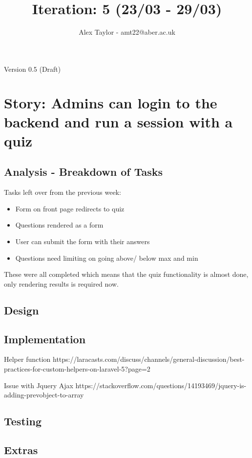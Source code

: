 \documentclass{article}
\title{Iteration: 5 (23/03 - 29/03)}
\author{Alex Taylor - amt22@aber.ac.uk}
\begin{document}
\maketitle
\begin{center}
	Version 0.5 (Draft)
\end{center}
\tableofcontents
\thispagestyle{empty}
\newpage

\section{Story: Admins can login to the backend and run a session with a quiz}
\subsection{Analysis - Breakdown of Tasks}
Tasks left over from the previous week:
\begin{itemize}
	\item Form on front page redirects to quiz
	\item Questions rendered as a form
	\item User can submit the form with their answers
	\item Questions need limiting on going above/ below max and min
\end{itemize}
These were all completed which means that the quiz functionality is almost done, only rendering results is required now.
\subsection{Design}
\subsection{Implementation}
Helper function https://laracasts.com/discuss/channels/general-discussion/best-practices-for-custom-helpers-on-laravel-5?page=2

Issue with Jquery Ajax https://stackoverflow.com/questions/14193469/jquery-is-adding-prevobject-to-array
\subsection{Testing}
\subsection{Extras}
\newpage
\end{document}
